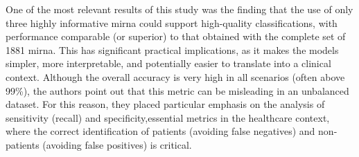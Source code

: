 

One of the most relevant results of this study was the finding that the use of
only three highly informative \gls{mirna} could support high-quality
classifications, with performance comparable (or superior) to that obtained
with the complete set of 1881 \gls{mirna}. This has significant practical
implications, as it makes the models simpler, more interpretable, and
potentially easier to translate into a clinical context. Although the overall
accuracy is very high in all scenarios (often above 99\%), the authors point
out that this metric can be misleading in an unbalanced dataset. For this
reason, they placed particular emphasis on the analysis of sensitivity (recall)
and specificity,essential metrics in the healthcare context, where the correct
identification of patients (avoiding false negatives) and non-patients
(avoiding false positives) is critical.

